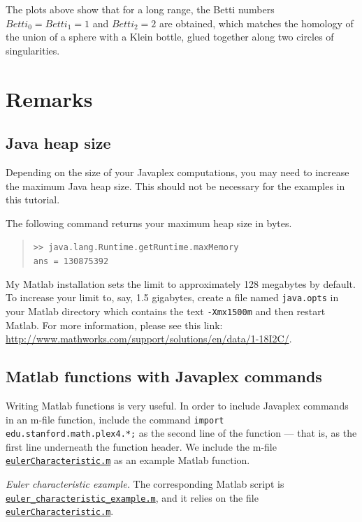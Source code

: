 \documentclass[amscd, amssymb, verbatim]{amsart}[12pt]
\theoremstyle{remark}
\theoremstyle{remark}
\theoremstyle{remark}
\begin{document}
The plots above show that for a long range, the Betti numbers $Betti_0 = Betti_1 = 1$ and $Betti_2 = 2$ are obtained, which matches the homology of the union of a sphere with a Klein bottle, glued together along two circles of singularities.



\section{Remarks} 


\subsection{Java heap size}\label{SS:java-heap-size}
Depending on the size of your Javaplex computations, you may need to increase the maximum Java heap size. This should not be necessary for the examples in this tutorial.

The following command returns your maximum heap size in bytes.
\begin{quote} \texttt{>> java.lang.Runtime.getRuntime.maxMemory\\
ans = 130875392
} \end{quote}
My Matlab installation sets the limit to approximately 128 megabytes by default. To increase your limit to, say, 1.5 gigabytes, create a file named \texttt{java.opts} in your Matlab directory which contains the text \texttt{-Xmx1500m} and then restart Matlab. For more information, please see this link: \url{http://www.mathworks.com/support/solutions/en/data/1-18I2C/}.


\subsection{Matlab functions with Javaplex commands}\label{SS:matlabFunctions}
Writing Matlab functions is very useful. In order to include Javaplex commands in an m-file function, include the command \texttt{import edu.stanford.math.plex4.*;} as the second line of the function ---  that is, as the first line underneath the function header. We include the m-file \href{https://github.com/appliedtopology/javaplex/tree/master/src/matlab/for_distribution/tutorial_examples/eulerCharacteristic.m}{\texttt{eulerCharacteristic.m}} as an example Matlab function.

{\em Euler characteristic example.}
The corresponding Matlab script is \href{https://github.com/appliedtopology/javaplex/tree/master/src/matlab/for_distribution/tutorial_examples/euler_characteristic_example.m}{\texttt{euler\_characteristic\_example.m}}, and it relies on the file \href{https://github.com/appliedtopology/javaplex/tree/master/src/matlab/for_distribution/tutorial_examples/eulerCharacteristic.m}{\texttt{eulerCharacteristic.m}}. 
\end{document}
